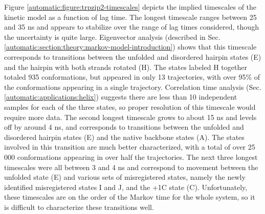 Figure \ref{automatic:figure:trpzip2-timescales} depicts the implied timescales of the kinetic model as a function of lag time.
The longest timescale ranges between 25 and 35 ns and appears to stabilize over the range of lag times considered, though the uncertainty is quite large.
Eigenvector analysis (described in Sec. \ref{automatic:section:theory:markov-model-introduction}) shows that this timescale corresponds to transitions between the unfolded and disordered hairpin states (E) and the hairpin with both strands rotated (H).
The states labeled H together totaled 935 conformations, but appeared in only 13 trajectories, with over 95\% of the conformations appearing in a single trajectory.
Correlation time analysis (Sec. \ref{automatic:applications:helix}) suggests there are less than 10 independent samples for each of the three states, so proper resolution of this timescale would require more data.
The second longest timescale grows to about 15 ns and levels off by around 4 ns, and corresponds to transitions between the unfolded and disordered hairpin states (E) and the 
native backbone states (A).
The states involved in this transition are much better characterized, with a total of over 25 000 conformations appearing in over half the trajectories.
The next three longest timescales were all between 3 and 4 ns and correspond to movement between the unfolded state (E) and various sets of misregistered states, namely
the newly identified misregistered states I and J, and the +1C state (C).
Unfortunately, these timescales are on the order of the Markov time for the whole system, so it is difficult to characterize these transitions well.

